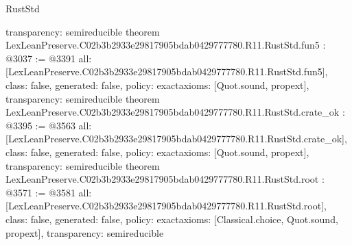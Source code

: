 \begin{lexlean}{RustStd}
\begin{coremodule}
{  transparency: semireducible
}
theorem LexLeanPreserve.C02b3b2933e29817905bdab0429777780.R11.RustStd.fun5 : @3037 := @3391 {
  all: [LexLeanPreserve.C02b3b2933e29817905bdab0429777780.R11.RustStd.fun5],
  class: false,
  generated: false,
  policy: exact{axioms: [Quot.sound, propext]},
  transparency: semireducible
}
theorem LexLeanPreserve.C02b3b2933e29817905bdab0429777780.R11.RustStd.crate_ok : @3395 := @3563 {
  all: [LexLeanPreserve.C02b3b2933e29817905bdab0429777780.R11.RustStd.crate_ok],
  class: false,
  generated: false,
  policy: exact{axioms: [Quot.sound, propext]},
  transparency: semireducible
}
theorem LexLeanPreserve.C02b3b2933e29817905bdab0429777780.R11.RustStd.root : @3571 := @3581 {
  all: [LexLeanPreserve.C02b3b2933e29817905bdab0429777780.R11.RustStd.root],
  class: false,
  generated: false,
  policy: exact{axioms: [Classical.choice, Quot.sound, propext]},
  transparency: semireducible
}


\end{coremodule}
\end{lexlean}

